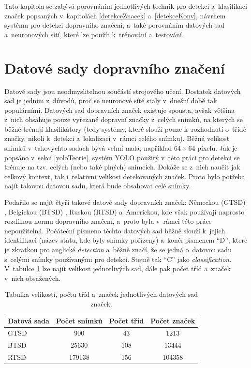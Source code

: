 Tato kapitola se zabývá porovnáním jednotlivých technik pro detekci a~klasifikaci značek popsaných v~kapitolách \ref{detekceZnacek} a~\ref{detekceKonv}, návrhem systému pro detekci dopravního značení, a~také porovnáním datových sad a~neuronových sítí, které lze použít k~trénování a~testování.


\section{Datové sady dopravního značení}
\label{datoveSady}
Datové sady jsou neodmyslitelnou součástí strojového učení. Dostatek datových sad je jedním z~důvodů, proč se neuronové sítě staly v~dnešní době tak populárními. Datových sad dopravních značek existuje spousta, avšak většina z~nich obsahuje pouze vyřezané dopravní značky z~celých snímků, na kterých se běžně trénují klasifikátory (tedy systémy, které slouží pouze k~rozhodnutí o~třídě značky, nikoli k~detekci a~lokalizaci v~rámci celého snímku). Běžná velikost snímků v~takovýchto sadách bývá velmi malá, například $64 \times 64$ pixelů. Jak je popsáno v~sekci \ref{yoloTeorie}, systém YOLO použitý v~této práci pro detekci se trénuje na tzv. celých (nebo také plných) snímcích. Dokáže se z~nich naučit jak celkový kontext, tak i~relativní velikost detekovaných značek. Proto bylo potřeba najít takovou datovou sadu, která bude obsahovat celé snímky.

Podařilo se najít čtyři takové datové sady dopravních značek: Německou (GTSD) \cite{gtsd}, Belgickou (BTSD) \cite{btsd}, Ruskou (RTSD) \cite{rtsd} a~Americkou, kde však používají naprosto rozdílnou normu dopravního značení, a~proto byla v~rámci této práce nepoužitelná. Počáteční písmeno těchto datových sad běžně slouží k~jejich identifikaci (název státu, kde byly snímky pořízeny) a~končí písmenem ``D'', které je zkratkou pro anglické \emph{detection} a~běžně značí, že se jedná o~datovou sadu s~celými snímky používanými pro detekci. Stejně tak ``C'' jako \emph{classification}. V~tabulce \ref{tabulkaDatasety} lze najít velikost jednotlivých sad, dále pak počet tříd a~značek v~nich obsažených.

\begin{table}[H]
	\vskip6pt
	\centering
    \begin{tabular}{ l | c | c | c }
        Datová sada & Počet snímků & Počet tříd & Počet značek \\
        \toprule
        GTSD \cite{gtsd} & 900 & 43 & 1213 \\
        BTSD \cite{btsd} & 25630 & 108 & 13444 \\
        RTSD \cite{rtsd} & 179138 & 156 & 104358 \\
    \end{tabular}
    \caption{Tabulka velikostí, počtu tříd a~značek jednotlivých datových sad značek.}
    \vskip6pt
    \label{tabulkaDatasety}
\end{table}

